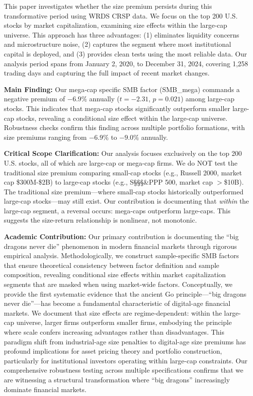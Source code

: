 \documentclass[10pt,letterpaper]{article}
\begin{document}
This paper investigates whether the size premium persists during this transformative period using WRDS CRSP data. We focus on the top 200 U.S. stocks by market capitalization, examining size effects within the large-cap universe. This approach has three advantages: (1) eliminates liquidity concerns and microstructure noise, (2) captures the segment where most institutional capital is deployed, and (3) provides clean tests using the most reliable data. Our analysis period spans from January 2, 2020, to December 31, 2024, covering 1,258 trading days and capturing the full impact of recent market changes.

\textbf{Main Finding:} Our mega-cap specific SMB factor (SMB\_mega) commands a negative premium of $-6.9\%$ annually ($t=-2.31$, $p=0.021$) among large-cap stocks. This indicates that mega-cap stocks significantly outperform smaller large-cap stocks, revealing a conditional size effect within the large-cap universe. Robustness checks confirm this finding across multiple portfolio formations, with size premiums ranging from $-6.9\%$ to $-9.0\%$ annually.

\textbf{Critical Scope Clarification:} Our analysis focuses exclusively on the top 200 U.S. stocks, all of which are large-cap or mega-cap firms. We do NOT test the traditional size premium comparing small-cap stocks (e.g., Russell 2000, market cap \$300M-\$2B) to large-cap stocks (e.g., S\S\S\S\&PPP 500, market cap $>$\$10B). The traditional size premium---where small-cap stocks historically outperformed large-cap stocks---may still exist. Our contribution is documenting that \textit{within} the large-cap segment, a reversal occurs: mega-caps outperform large-caps. This suggests the size-return relationship is nonlinear, not monotonic.

\textbf{Academic Contribution:} Our primary contribution is documenting the ``big dragons never die'' phenomenon in modern financial markets through rigorous empirical analysis. Methodologically, we construct sample-specific SMB factors that ensure theoretical consistency between factor definition and sample composition, revealing conditional size effects within market capitalization segments that are masked when using market-wide factors. Conceptually, we provide the first systematic evidence that the ancient Go principle---``big dragons never die''---has become a fundamental characteristic of digital-age financial markets. We document that size effects are regime-dependent: within the large-cap universe, larger firms outperform smaller firms, embodying the principle where scale confers increasing advantages rather than disadvantages. This paradigm shift from industrial-age size penalties to digital-age size premiums has profound implications for asset pricing theory and portfolio construction, particularly for institutional investors operating within large-cap constraints. Our comprehensive robustness testing across multiple specifications confirms that we are witnessing a structural transformation where ``big dragons'' increasingly dominate financial markets.
\end{document}
